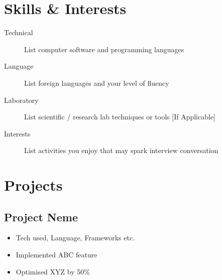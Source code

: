 \documentclass[11pt]{article}
\begin{document}
\section{Skills \& Interests}
\begin{description}
	\item[Technical] List computer software and programming languages
	\item[Language] List foreign languages and your level of fluency
	\item[Laboratory] List scientific / research lab techniques or tools [If Applicable]
	\item[Interests] List activities you enjoy that may spark interview conversation
\end{description}


\section{Projects}
\subsection{Project Neme  }
\begin{itemize}
  \item Tech used, Language, Frameworks etc.
  \item Implemented ABC feature
  \item Optimised XYZ by 50\%
\end{itemize}
\end{document}

